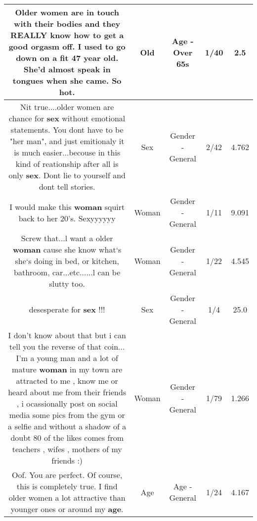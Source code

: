 \documentclass[11pt]{article}
\newlength\mylength
\begin{document}
\begin{center}
\begin{longtable}{|C{.65\mylength}|C{.30\mylength}|C{.12\mylength}|C{.12\mylength}|C{.12\mylength}|}
  \small Older women are in touch with their bodies and they REALLY know how to get a good orgasm off.  I used to go down on a fit 47 year \textbf{old}. She'd almost speak in tongues when she came.  So hot.\normalsize   & Old & Age - Over 65s & 1/40 & 2.5 \\  \hline
  \small Nit true....older women are chance for \textbf{sex} without emotional statements. You dont have to be "her man", and just emitionaly it is much easier...becouse in this kind of reationship after all is only \textbf{sex}. Dont lie to yourself and dont tell stories.\normalsize   & Sex & Gender - General & 2/42 & 4.762 \\  \hline
  \small I would make this \textbf{woman} squirt back to her 20's. Sexyyyyyy\normalsize   & Woman & Gender - General & 1/11 & 9.091 \\  \hline
  \small Screw that...l want a older \textbf{woman} cause she know what`s she`s doing in bed, or kitchen, bathroom, car...etc......l can be slutty too.\normalsize   & Woman & Gender - General & 1/22 & 4.545 \\  \hline
  \small desesperate for \textbf{sex} !!!\normalsize   & Sex & Gender - General & 1/4 & 25.0 \\  \hline
  \small I don't know about that but i can tell you the reverse of that coin... I'm a young man and a lot of mature \textbf{woman} in my town are attracted to me , know me or heard about me from their friends , i ocassionally post on social media some pics from the gym or a selfie and without a shadow of a doubt 80 of the likes comes from teachers , wifes , mothers of my friends :)\normalsize   & Woman & Gender - General & 1/79 & 1.266 \\  \hline
  \small Oof. You are perfect. Of course, this is completely true. I find older women a lot attractive than younger ones or around my \textbf{age}.\normalsize   & Age & Age - General & 1/24 & 4.167 \\  \hline

\end{longtable}
\end{center}
\end{document}
